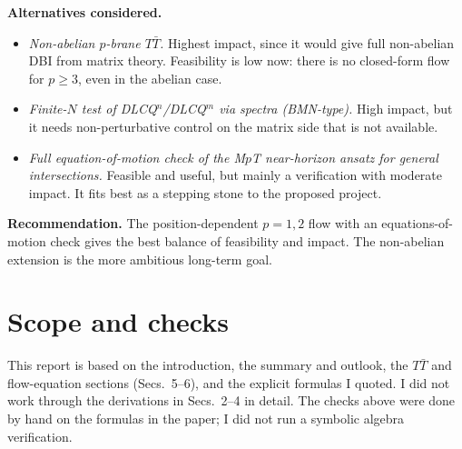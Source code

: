 \documentclass[11pt]{article}
\begin{document}
\textbf{Alternatives considered.}
\begin{itemize}
\item \emph{Non-abelian $p$-brane $T\bar T$.} Highest impact, since it would give full non-abelian DBI from matrix theory. Feasibility is low now: there is no closed-form flow for $p\ge3$, even in the abelian case.
\item \emph{Finite-$N$ test of DLCQ$^n$/DLCQ$^m$ via spectra (BMN-type).} High impact, but it needs non-perturbative control on the matrix side that is not available.
\item \emph{Full equation-of-motion check of the M$p$T near-horizon ansatz for general intersections.} Feasible and useful, but mainly a verification with moderate impact. It fits best as a stepping stone to the proposed project.
\end{itemize}

\textbf{Recommendation.} The position-dependent $p=1,2$ flow with an equations-of-motion check gives the best balance of feasibility and impact. The non-abelian extension is the more ambitious long-term goal.

\section*{Scope and checks}

This report is based on the introduction, the summary and outlook, the $T\bar T$ and flow-equation sections (Secs.~5--6), and the explicit formulas I quoted. I did not work through the derivations in Secs.~2--4 in detail. The checks above were done by hand on the formulas in the paper; I did not run a symbolic algebra verification.
\end{document}
